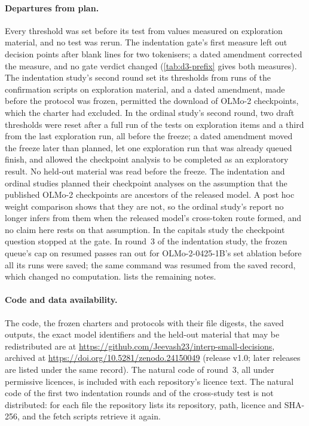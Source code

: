 \documentclass[11pt]{article}
\newcommand{\olmo}{OLMo-2-0425-1B}
\begin{document}
\paragraph{Departures from plan.} Every threshold was set before its test from values measured on exploration material, and no test was rerun. The indentation gate's first measure left out decision points after blank lines for two tokenisers; a dated amendment corrected the measure, and no gate verdict changed (\cref{tab:d3-prefix} gives both measures). The indentation study's second round set its thresholds from runs of the confirmation scripts on exploration material, and a dated amendment, made before the protocol was frozen, permitted the download of OLMo-2 checkpoints, which the charter had excluded. In the ordinal study's second round, two draft thresholds were reset after a full run of the tests on exploration items and a third from the last exploration run, all before the freeze; a dated amendment moved the freeze later than planned, let one exploration run that was already queued finish, and allowed the checkpoint analysis to be completed as an exploratory result. No held-out material was read before the freeze. The indentation and ordinal studies planned their checkpoint analyses on the assumption that the published OLMo-2 checkpoints are ancestors of the released model. A post hoc weight comparison shows that they are not, so the ordinal study's report no longer infers from them when the released model's cross-token route formed, and no claim here rests on that assumption. In the capitals study the checkpoint question stopped at the gate. In round~3 of the indentation study, the frozen queue's cap on resumed passes ran out for \olmo{}'s set ablation before all its runs were saved; the same command was resumed from the saved record, which changed no computation.  lists the remaining notes.

\paragraph{Code and data availability.} The code, the frozen charters and protocols with their file digests, the saved outputs, the exact model identifiers and the held-out material that may be redistributed are at \url{https://github.com/Jeevash23/interp-small-decisions}, archived at \url{https://doi.org/10.5281/zenodo.24150049} (release v1.0; later releases are listed under the same record). The natural code of round~3, all under permissive licences, is included with each repository's licence text. The natural code of the first two indentation rounds and of the cross-study test is not distributed: for each file the repository lists its repository, path, licence and SHA-256, and the fetch scripts retrieve it again.
\end{document}
